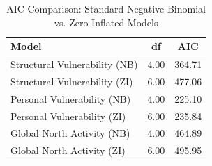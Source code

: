 \begin{table}[ht]
\centering
\begin{tabular}{p{8cm}cc}
  \hline
Model & df & AIC \\ 
  \hline
Structural Vulnerability (NB) & 4.00 & 364.71 \\ 
  Structural Vulnerability (ZI) & 6.00 & 477.06 \\ 
  Personal Vulnerability (NB) & 4.00 & 225.10 \\ 
  Personal Vulnerability (ZI) & 6.00 & 235.84 \\ 
  Global North Activity (NB) & 4.00 & 464.89 \\ 
  Global North Activity (ZI) & 6.00 & 495.95 \\ 
   \hline
\end{tabular}
\caption{AIC Comparison: Standard Negative Binomial vs. Zero-Inflated Models} 
\end{table}
